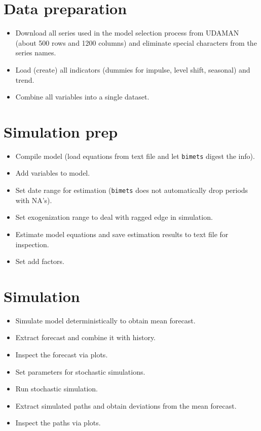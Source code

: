 \documentclass[
  letterpaper,
  DIV=11,
  numbers=noendperiod]{scrreport}
\providecommand{\tightlist}{%
  \setlength{\itemsep}{0pt}\setlength{\parskip}{0pt}}\usepackage{longtable,booktabs,array}
\begin{document}
\section{Data preparation}\label{data-preparation}

\begin{itemize}
\tightlist
\item
  Download all series used in the model selection process from UDAMAN
  (about 500 rows and 1200 columns) and eliminate special characters
  from the series names.\\
\item
  Load (create) all indicators (dummies for impulse, level shift,
  seasonal) and trend.\\
\item
  Combine all variables into a single dataset.
\end{itemize}

\section{Simulation prep}\label{simulation-prep}

\begin{itemize}
\tightlist
\item
  Compile model (load equations from text file and let \texttt{bimets}
  digest the info).
\item
  Add variables to model.
\item
  Set date range for estimation (\texttt{bimets} does not automatically
  drop periods with NA's).
\item
  Set exogenization range to deal with ragged edge in simulation.\\
\item
  Estimate model equations and save estimation results to text file for
  inspection.
\item
  Set add factors.
\end{itemize}

\section{Simulation}\label{simulation}

\begin{itemize}
\tightlist
\item
  Simulate model deterministically to obtain mean forecast.
\item
  Extract forecast and combine it with history.
\item
  Inspect the forecast via plots.
\item
  Set parameters for stochastic simulations.
\item
  Run stochastic simulation.
\item
  Extract simulated paths and obtain deviations from the mean forecast.
\item
  Inspect the paths via plots.
\end{itemize}
\end{document}
